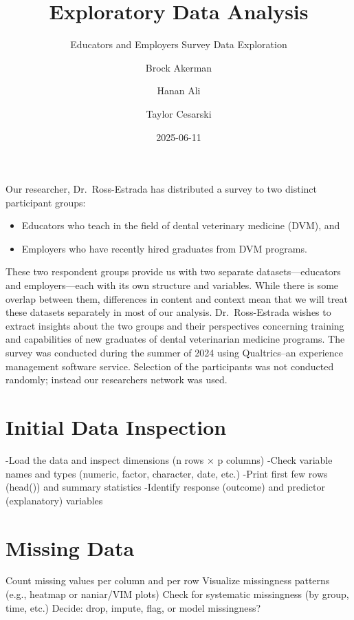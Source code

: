 \documentclass[
  11pt,
  letterpaper,
  DIV=11,
  numbers=noendperiod]{scrartcl}
\title{Exploratory Data Analysis}
\subtitle{Educators and Employers Survey Data Exploration}
\author{Brock Akerman \and Hanan Ali \and Taylor Cesarski}
\date{2025-06-11}
\renewcommand*\contentsname{Table of contents}
\newcommand\contentsname{Table of contents}
\begin{document}
\maketitle

\renewcommand*\contentsname{Table of contents}
{
\hypersetup{linkcolor=}
\setcounter{tocdepth}{2}
\tableofcontents
}

\newpage

Our researcher, Dr.~Ross-Estrada has distributed a survey to two
distinct participant groups:

\begin{itemize}
\item
  Educators who teach in the field of dental veterinary medicine (DVM),
  and
\item
  Employers who have recently hired graduates from DVM programs.
\end{itemize}

These two respondent groups provide us with two separate
datasets---educators and employers---each with its own structure and
variables. While there is some overlap between them, differences in
content and context mean that we will treat these datasets separately in
most of our analysis. Dr.~Ross-Estrada wishes to extract insights about
the two groups and their perspectives concerning training and
capabilities of new graduates of dental veterinarian medicine programs.
The survey was conducted during the summer of 2024 using Qualtrics--an
experience management software service. Selection of the participants
was not conducted randomly; instead our researchers network was used.

\section{Initial Data Inspection}\label{initial-data-inspection}

-Load the data and inspect dimensions (n rows × p columns) -Check
variable names and types (numeric, factor, character, date, etc.) -Print
first few rows (head()) and summary statistics -Identify response
(outcome) and predictor (explanatory) variables

\section{Missing Data}\label{missing-data}

Count missing values per column and per row Visualize missingness
patterns (e.g., heatmap or naniar/VIM plots) Check for systematic
missingness (by group, time, etc.) Decide: drop, impute, flag, or model
missingness?
\end{document}
